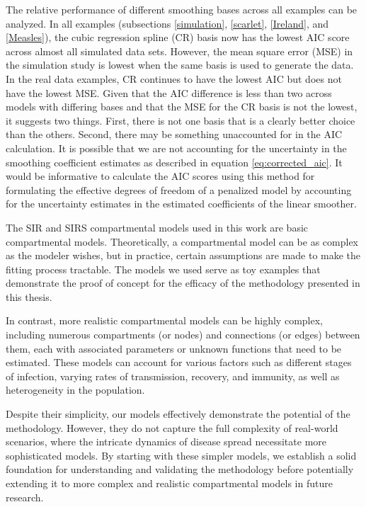 \documentclass[
11pt, %
oneside, %
english, %
singlespacing, %
]{macthesis} %
\begin{document}
The relative performance of different smoothing bases across all examples can be analyzed. In all examples (subsections \ref{simulation}, \ref{scarlet}, \ref{Ireland}, and \ref{Measles}), the cubic regression spline (CR) basis now has the lowest AIC score across almost all simulated data sets. However, the mean square error (MSE) in the simulation study is lowest when the same basis is used to generate the data. In the real data examples, CR continues to have the lowest AIC but does not have the lowest MSE. Given that the AIC difference is less than two across models with differing bases and that the MSE for the CR basis is not the lowest, it suggests two things. First, there is not one basis that is a clearly better choice than the others. Second, there may be something unaccounted for in the AIC calculation. It is possible that we are not accounting for the uncertainty in the smoothing coefficient estimates as described in equation \ref{eq:corrected_aic}. It would be informative to calculate the AIC scores using this method for formulating the effective degrees of freedom of a penalized model by accounting for the uncertainty estimates in the estimated coefficients of the linear smoother.

The SIR and SIRS compartmental models used in this work are basic compartmental models. Theoretically, a compartmental model can be as complex as the modeler wishes, but in practice, certain assumptions are made to make the fitting process tractable. The models we used serve as toy examples that demonstrate the proof of concept for the efficacy of the methodology presented in this thesis.

In contrast, more realistic compartmental models can be highly complex, including numerous compartments (or nodes) and connections (or edges) between them, each with associated parameters or unknown functions that need to be estimated. These models can account for various factors such as different stages of infection, varying rates of transmission, recovery, and immunity, as well as heterogeneity in the population.

Despite their simplicity, our models effectively demonstrate the potential of the methodology. However, they do not capture the full complexity of real-world scenarios, where the intricate dynamics of disease spread necessitate more sophisticated models. By starting with these simpler models, we establish a solid foundation for understanding and validating the methodology before potentially extending it to more complex and realistic compartmental models in future research.
\end{document}
